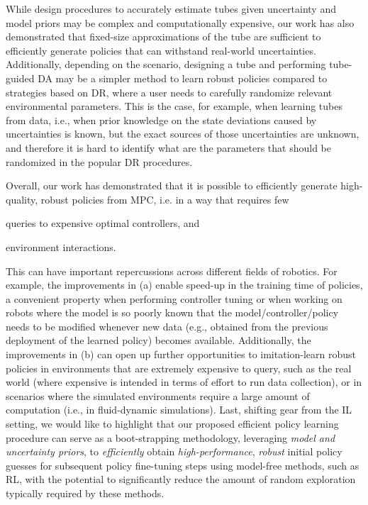 While design procedures to accurately estimate tubes given uncertainty and model priors may be complex and computationally expensive, our work has also demonstrated that fixed-size approximations of the tube are sufficient to efficiently generate policies that can withstand real-world uncertainties. Additionally, depending on the scenario, designing a tube and performing tube-guided \ac{DA} may be a simpler method to learn robust policies compared to strategies based on \ac{DR}, where a user needs to carefully randomize relevant environmental parameters. This is the case, for example, when learning tubes from data, i.e., when prior knowledge on the state deviations caused by uncertainties is known, but the exact sources of those uncertainties are unknown, and therefore it is hard to identify what are the parameters that should be randomized in the popular \ac{DR} procedures. 

Overall, our work has demonstrated that it is possible to efficiently generate high-quality, robust policies from \ac{MPC}, i.e. in a way that requires few 
\begin{inparaenum}[(a)]
    \item queries to expensive optimal controllers, and
    \item environment interactions.
\end{inparaenum}
This can have important repercussions across different fields of robotics. For example, the improvements in (a) enable speed-up in the training time of policies, a convenient property when performing controller tuning or when working on robots where the model is so poorly known that the model/controller/policy needs to be modified whenever new data (e.g., obtained from the previous deployment of the learned policy) becomes available. Additionally, the improvements in (b) can open up further opportunities to imitation-learn robust policies in environments that are extremely expensive to query, such as the real world (where expensive is intended in terms of effort to run data collection), or in scenarios where the simulated environments require a large amount of computation (i.e., in fluid-dynamic simulations). %
Last, shifting gear from the \ac{IL} setting, we would like to highlight that our proposed efficient policy learning procedure can serve as a boot-strapping methodology, leveraging \textit{model and uncertainty priors}, to \textit{efficiently} obtain \textit{high-performance}, \textit{robust} initial policy guesses for subsequent policy fine-tuning steps using model-free methods, such as \ac{RL}, with the potential to significantly reduce the amount of random exploration typically required by these methods.     




